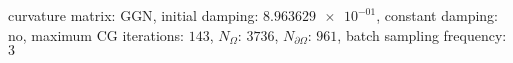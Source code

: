curvature matrix: $\text{GGN}$, initial damping: $\num[scientific-notation=true]{8.963629e-01}$, constant damping: $\text{no}$, maximum CG iterations: $\num[scientific-notation=false]{143}$, $N_{\Omega}$: $\num[scientific-notation=false]{3736}$, $N_{\partial\Omega}$: $\num[scientific-notation=false]{961}$, batch sampling frequency: $\num[scientific-notation=false]{3}$